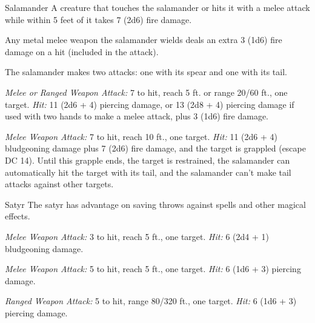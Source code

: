 \documentclass[10pt,a4paper,twoside,bg=print,twocolumn,openany,nodeprecatedcode]{dndbook}
\begin{document}
\begin{DndMonster}[float=t]{Salamander}
\DndMonsterBasics[
armor-class = {15 (natural armor)},
hit-points = {\DndDice{12d10 + 24}},
speed = {30 ft.}
]
\DndMonsterAbilityScores[
 str = 18,
 dex = 14,
 con = 15,
 int = 11,
 wis = 10,
 cha = 12
]
\DndMonsterDetails[
damage-vulnerabilities = {cold},
damage-resistances = {bludgeoning, piercing, slashing from nonmagical attacks},
damage-immunities = {fire},
senses = {darkvision 60 ft., passive perception 10},
languages = {Ignan},
challenge = 5,
]
A creature that touches the salamander or hits it with a melee attack while within 5 feet of it takes 7 (2d6) fire damage.

Any metal melee weapon the salamander wields deals an extra 3 (1d6) fire damage on a hit (included in the attack).

The salamander makes two attacks: one with its spear and one with its tail.

\textsl{Melee or Ranged Weapon Attack:} 7 to hit, reach 5 ft. or range 20/60 ft., one target. \textsl{Hit:} 11 (2d6 + 4) piercing damage, or 13 (2d8 + 4) piercing damage if used with two hands to make a melee attack, plus 3 (1d6) fire damage.

\textsl{Melee Weapon Attack:} 7 to hit, reach 10 ft., one target. \textsl{Hit:} 11 (2d6 + 4) bludgeoning damage plus 7 (2d6) fire damage, and the target is grappled (escape DC 14). Until this grapple ends, the target is restrained, the salamander can automatically hit the target with its tail, and the salamander can't make tail attacks against other targets.

\end{DndMonster}



\begin{DndMonster}[float=t]{Satyr}
\DndMonsterBasics[
armor-class = {14 (\textit{leather armor})},
hit-points = {\DndDice{7d8}},
speed = {40 ft.}
]
\DndMonsterAbilityScores[
 str = 12,
 dex = 16,
 con = 11,
 int = 12,
 wis = 10,
 cha = 14
]
\DndMonsterDetails[
skills = {Perception +2, Performance +6, Stealth +5},
languages = {Common, Elvish, Sylvan},
challenge = 1/2,
]
The satyr has advantage on saving throws against spells and other magical effects.

\textsl{Melee Weapon Attack:} 3 to hit, reach 5 ft., one target. \textsl{Hit:} 6 (2d4 + 1) bludgeoning damage.

\textsl{Melee Weapon Attack:} 5 to hit, reach 5 ft., one target. \textsl{Hit:} 6 (1d6 + 3) piercing damage.

\textsl{Ranged Weapon Attack:} 5 to hit, range 80/320 ft., one target. \textsl{Hit:} 6 (1d6 + 3) piercing damage.

\end{DndMonster}
\end{document}

